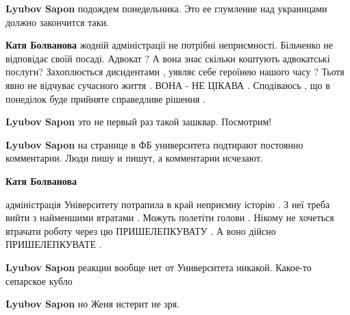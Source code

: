 \begin{itemize}
\begin{itemize}

\textbf{Lyubov Sapon} подождем понедельника. Это ее глумление над украинцами должно закончится таки.


\textbf{Катя Болванова} жодній адміністрації не потрібні неприємності.
Більченко не відповідає своїй посаді. Адвокат ? А вона знає скільки коштують
адвокатські послуги? Захоплюється дисидентами , уявляє себе героїнею нашого
часу ? Тьотя явно не відчуває сучасного життя . ВОНА - НЕ ЦІКАВА . Сподіваюсь ,
що в понеділок буде прийняте справедливе рішення .



\textbf{Lyubov Sapon} это не первый раз такой зашквар. Посмотрим!


\textbf{Lyubov Sapon} на странице в ФБ университета подтирают постоянно комментарии. Люди пишу и пишут, а комментарии исчезают.


\textbf{Катя Болванова} 

адміністрація Університету потрапила в край неприємну історію . З неї треба
вийти з найменшими втратами . Можуть полетіти голови . Нікому не хочеться
втрачати роботу через цю ПРИШЕЛЕПКУВАТУ . А воно дійсно ПРИШЕЛЕПКУВАТЕ .



\textbf{Lyubov Sapon} реакции вообще нет от Университета никакой. Какое-то сепарское кубло


\textbf{Lyubov Sapon} но Женя истерит не зря.



\end{itemize}
\end{itemize}
